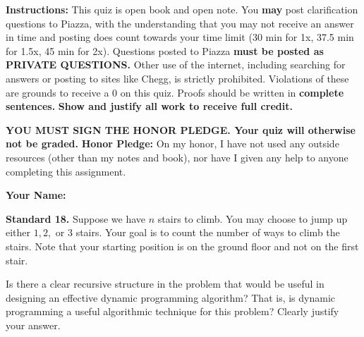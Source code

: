 \documentclass[11pt]{article}
\begin{document}
\renewcommand{\headrulewidth}{0.5pt}

\phantom{Test}

\begin{small}
\noindent \textbf{Instructions:} This quiz is open book and open note. You \textbf{may} post clarification questions to Piazza, with the understanding that you may not receive an answer in time and posting does count towards your time limit (30 min for 1x, 37.5 min for 1.5x, 45 min for 2x). Questions posted to Piazza \textbf{must be posted as PRIVATE QUESTIONS.} Other use of the internet, including searching for answers or posting to sites like Chegg, is strictly prohibited. Violations of these are grounds to receive a 0 on this quiz. Proofs should be written in \textbf{complete sentences.} \textbf{Show and justify all work to receive full credit.} 

\noindent \textbf{YOU MUST SIGN THE HONOR PLEDGE. Your quiz will otherwise not be graded.}  
\noindent \textbf{Honor Pledge:} On my honor, I have not used any outside resources (other than my notes and book), nor have I given any help to anyone completing this assignment. 

\noindent \textbf{Your Name:} \underline{\hskip 250pt}
\end{small} 

\hrulefill 


\noindent \textbf{Standard 18.} Suppose we have $n$ stairs to climb. You may choose to jump up either $1, 2,$ or $3$ stairs. Your goal is to count the number of ways to climb the stairs. Note that your starting position is on the ground floor and not on the first stair. 

\noindent Is there a clear recursive structure in the problem that would be useful in designing an effective dynamic programming algorithm? That is, is dynamic programming a useful algorithmic technique for this problem? Clearly justify your answer.



\end{document}
